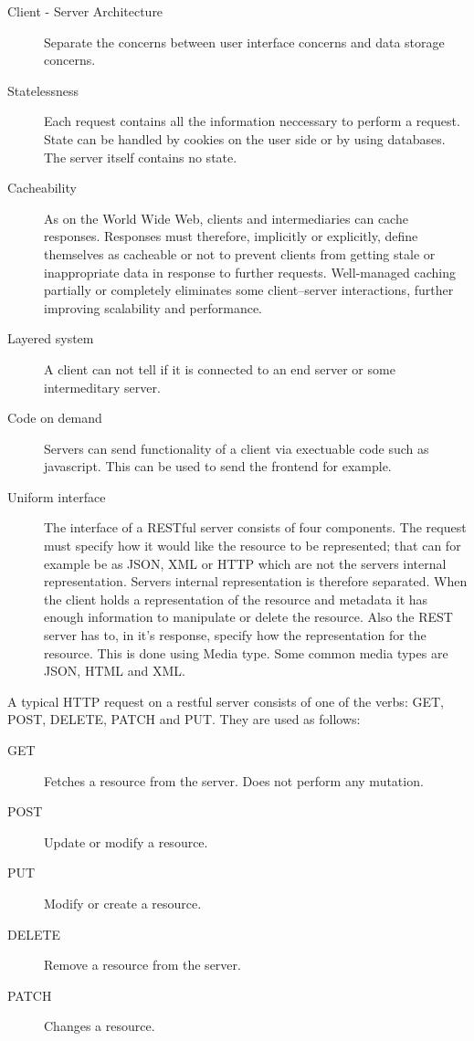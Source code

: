\begin{description}
\item[ Client - Server Architecture ] Separate the concerns between user
interface concerns and data storage concerns.
\item[Statelessness] Each request contains all the information neccessary to
perform a request. State can be handled by cookies on the user side or by using
databases. The server itself contains no state.
\item[Cacheability] As on the World Wide Web, clients and intermediaries can
cache responses. Responses must therefore, implicitly or explicitly, define
themselves as cacheable or not to prevent clients from getting stale or
inappropriate data in response to further requests. Well-managed caching
partially or completely eliminates some client–server interactions, further
improving scalability and performance. 
\item[Layered system] A client can not tell if it is connected to an end server
or some intermeditary server. 
\item[Code on demand] Servers can send functionality of a client via exectuable
code such as javascript. This can be used to send the frontend for example.
\item[Uniform interface] The interface of a RESTful server consists of four
components. The request must specify how it would like the resource to be
represented; that can for example be as JSON, XML or HTTP which are not the
servers internal representation. Servers internal representation is therefore
separated. When the client holds a representation of the resource and metadata
it has enough information to manipulate or delete the resource. Also the REST
server has to, in it's response, specify how the representation for the
resource. This is done using Media type. Some common media types are JSON, HTML
and XML.
\end{description}

A typical HTTP request on a restful server consists of one of the  verbs: GET,
POST, DELETE, PATCH and PUT. They are used as follows:

\begin{description}
\item[GET] Fetches a resource from the server. Does not perform any mutation. 
\item[POST] Update or modify a resource.
\item[PUT] Modify or create a resource.
\item[DELETE] Remove a resource from the server.
\item[PATCH] Changes a resource.
\end{description}

